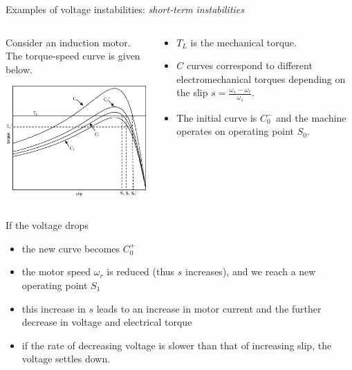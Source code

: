 \begin{frame}[allowframebreaks]{Examples of voltage instabilities: \textit{short-term instabilities}}
\begin{columns}
    \begin{column}{0.6\textwidth}
        Consider an induction motor. The torque-speed curve is given below.
        \begin{center}
        \includegraphics[width=0.75\linewidth]{images/Motorstalling.png}
        \end{center}
    \end{column}
    \begin{column}{0.4\textwidth}
        \begin{itemize}
            \item $T_L$ is the mechanical torque.
            \item $C$ curves correspond to different electromechanical torques depending on the slip $s=\frac{\omega_s - \omega_r}{\omega_s}$.
            \item The initial curve is $C_0^-$ and the machine operates on operating point $S_0$. 
        \end{itemize}
    \end{column}
\end{columns}
If the voltage drops
\begin{itemize}
    \item the new curve becomes $C_0^+$
    \item the motor speed $\omega_r$ is reduced (thus $s$ increases), and we reach a new operating point $S_1$
    \item this increase in $s$ leads to an increase in motor current and the further decrease in voltage and electrical torque
    \item if the rate of decreasing voltage is slower than that of increasing slip, the voltage settles down.
\end{itemize}


\end{frame}
